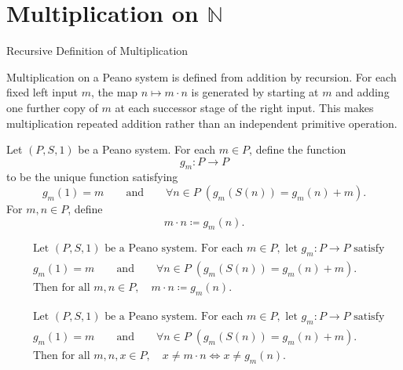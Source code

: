 \section{Multiplication on \texorpdfstring{$\mathbb{N}$}{N}}

\begin{topicbox}{Recursive Definition of Multiplication}
\begin{exposition}
Multiplication on a Peano system is defined from addition by recursion. For
each fixed left input $m$, the map $n \mapsto m \cdot n$ is generated by
starting at $m$ and adding one further copy of $m$ at each successor stage of
the right input. This makes multiplication repeated addition rather than an
independent primitive operation.
\end{exposition}

\begin{tcolorbox}[colback=defbox, colframe=defborder, arc=2pt,
  left=6pt, right=6pt, top=4pt, bottom=4pt,
  title={\small\textbf{Definition (Multiplication on a Peano System)}},
  fonttitle=\small\bfseries]
\begin{definition}
\label{def:multiplication-on-peano-system}
Let $(P,S,1)$ be a Peano system. For each $m \in P$, define the function
\[
g_m : P \to P
\]
to be the unique function satisfying
\[
g_m(1)=m
\qquad\text{and}\qquad
\forall n \in P\;(g_m(S(n))=g_m(n)+m).
\]
For $m,n \in P$, define
\[
m \cdot n \coloneqq g_m(n).
\]
\end{definition}
\end{tcolorbox}

\begin{remark*}
\[
\begin{aligned}
&\text{Let } (P,S,1) \text{ be a Peano system. For each } m \in P,
\text{ let } g_m : P \to P \text{ satisfy}\\
&g_m(1)=m
\qquad\text{and}\qquad
\forall n \in P\;(g_m(S(n))=g_m(n)+m).\\
&\text{Then for all } m,n \in P,\quad m \cdot n \coloneqq g_m(n).
\end{aligned}
\]
\end{remark*}

\begin{remark*}
\[
\begin{aligned}
&\text{Let } (P,S,1) \text{ be a Peano system. For each } m \in P,
\text{ let } g_m : P \to P \text{ satisfy}\\
&g_m(1)=m
\qquad\text{and}\qquad
\forall n \in P\;(g_m(S(n))=g_m(n)+m).\\
&\text{Then for all } m,n,x \in P,\quad x \neq m \cdot n
\Longleftrightarrow
x \neq g_m(n).
\end{aligned}
\]
\end{remark*}


\end{topicbox}

